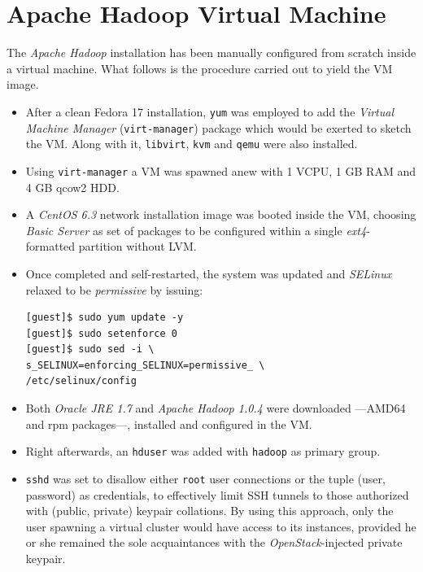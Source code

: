 \documentclass{sig-alternate}
\begin{document}
\section{Apache Hadoop Virtual Machine}\label{sec:hadvm}
\noindent The \emph{Apache Hadoop} installation has been manually configured from scratch inside a virtual machine. What follows is the procedure carried out to yield the VM image.

\begin{itemize}
 \item After a clean Fedora 17 installation, \texttt{yum} was employed to add the \emph{Virtual Machine Manager} (\texttt{virt-manager}) package which would be exerted to sketch the VM. Along with it, \texttt{libvirt}, \texttt{kvm} and \texttt{qemu} were also installed.
 
 \item Using \texttt{virt-manager} a VM was spawned anew with 1 VCPU, 1 GB RAM and 4 GB qcow2 HDD.
 
 \item A \emph{CentOS 6.3} network installation image was booted inside the VM, choosing \emph{Basic Server} as set of packages to be configured within a single \emph{ext4}-formatted partition without LVM.
 
 \item Once completed and self-restarted, the system was updated and \emph{SELinux} relaxed to be \emph{permissive} by issuing:
 
 \begin{verbatim}
[guest]$ sudo yum update -y
[guest]$ sudo setenforce 0
[guest]$ sudo sed -i \
s_SELINUX=enforcing_SELINUX=permissive_ \
/etc/selinux/config
 \end{verbatim}
 
 \item Both \emph{Oracle JRE 1.7} and \emph{Apache Hadoop 1.0.4} were downloaded ---AMD64 and rpm packages---, installed and configured in the VM.
 
 \item Right afterwards, an \texttt{hduser} was added with \texttt{hadoop} as primary group.

 \item \texttt{sshd} was set to disallow either \texttt{root} user connections or the tuple (user, password) as credentials, to effectively limit SSH tunnels to those authorized with (public, private) keypair collations. By using this approach, only the user spawning a virtual cluster would have access to its instances, provided he or she remained the sole acquaintances with the \emph{OpenStack}-injected private keypair.
 

\end{itemize}
\end{document}
